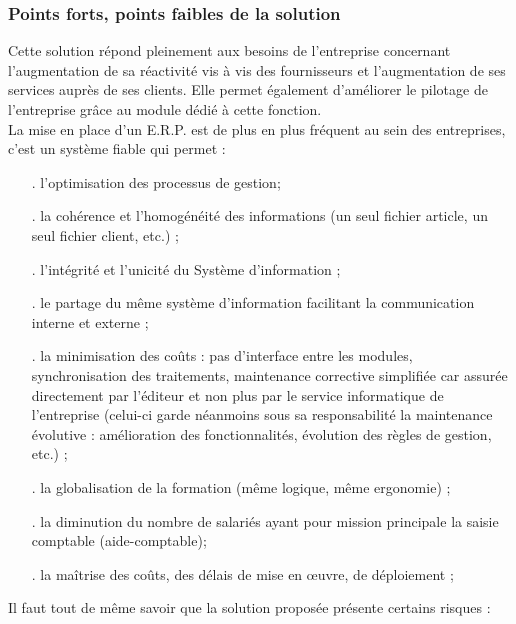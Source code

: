 \subsubsection{Points forts, points faibles de la solution}
Cette solution répond pleinement aux besoins de l'entreprise concernant l'augmentation de sa réactivité vis à vis des fournisseurs et l'augmentation de ses services auprès de ses clients. Elle permet également d'améliorer le pilotage de l'entreprise grâce au module dédié à cette fonction.\\
La mise en place d'un E.R.P. est de plus en plus fréquent au sein des entreprises, c'est un système fiable qui permet : 
\begin{itemize}
\item[.]l'optimisation des processus de gestion;
\item[.]la cohérence et l'homogénéité des informations (un seul fichier article, un seul fichier client, etc.) ;
\item[.]l'intégrité et l'unicité du Système d'information ;
\item[.]le partage du même système d’information facilitant la communication interne et externe ;
\item[.]la minimisation des coûts : pas d’interface entre les modules, synchronisation des traitements, maintenance corrective simplifiée car assurée directement par l'éditeur et non plus par le service informatique de l'entreprise (celui-ci garde néanmoins sous sa responsabilité la maintenance évolutive : amélioration des fonctionnalités, évolution des règles de gestion, etc.) ;
\item[.]la globalisation de la formation (même logique, même ergonomie) ;
\item[.]la diminution du nombre de salariés ayant pour mission principale la saisie comptable (aide-comptable);
\item[.]la maîtrise des coûts, des délais de mise en œuvre, de déploiement ;\\
\end{itemize}

Il faut tout de même savoir que la solution proposée présente certains risques : 

